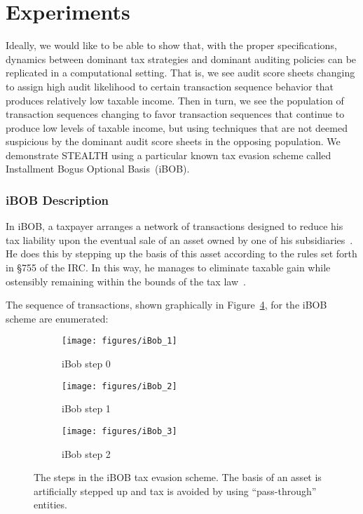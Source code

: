 \section{Experiments}
\label{sec:experiments}

Ideally, we would like to be able to show that, with the proper
specifications, dynamics between dominant tax strategies and dominant
auditing policies can be replicated in a computational setting. That
is, we see audit score sheets changing to assign high audit likelihood
to certain transaction sequence behavior that produces relatively low
taxable income. Then in turn, we see the population of transaction
sequences changing to favor transaction sequences that continue to
produce low levels of taxable income, but using techniques that are
not deemed suspicious by the dominant audit score sheets in the
opposing population. We demonstrate STEALTH using a particular known
tax evasion scheme called Installment Bogus Optional Basis~(iBOB).

\subsubsection{iBOB Description}
\label{sec:ibob}

In iBOB, a taxpayer arranges a network of transactions designed to
reduce his tax liability upon the eventual sale of an asset owned by
one of his subsidiaries~\cite{iBOB}.  He does this by stepping up the
basis of this asset according to the rules set forth in \S 755 of the
IRC.  In this way, he manages to eliminate taxable gain while
ostensibly remaining within the bounds of the tax
law~\cite{wright45financial}.

The sequence of transactions, shown graphically in
Figure~\ref{fig:iBob}, for the iBOB scheme are enumerated:

\begin{figure}[htp]
\centering
\begin{subfigure}{.30\textwidth}
  \centering \texttt{[image: figures/iBob\_1]}
  \caption{iBob step 0}
  \label{fig:iBob_1}
\end{subfigure}
\begin{subfigure}{.30\textwidth}
  \centering \texttt{[image: figures/iBob\_2]}
  \caption{iBob step 1}
  \label{fig:iBob_2}
\end{subfigure}
\begin{subfigure}{.30\textwidth}
  \centering \texttt{[image: figures/iBob\_3]}
  \caption{iBob step 2}
  \label{fig:iBob_3}
\end{subfigure}
\caption{The steps in the iBOB tax evasion scheme. The basis of an
  asset is artificially stepped up and tax is avoided by using
  ``pass-through'' entities.}
\label{fig:iBob}
\end{figure}

